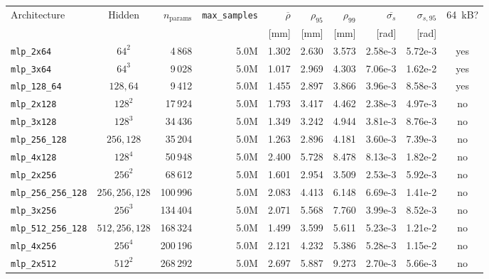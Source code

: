 \documentclass[a4paper,11pt]{article}
\newcommand{\SI}[2]{#1~#2}
\newcommand{\kilo}{k}
\newcommand{\byte}{B}
\begin{document}
\begin{table}[h]
\centering\footnotesize
\setlength{\tabcolsep}{4pt}
\begin{tabular}{lcrrrrrrrc}
\toprule
Architecture & Hidden & $n_{\text{params}}$ & \texttt{max\_samples} &
  $\overline{\rho}$ & $\rho_{95}$ & $\rho_{99}$ & $\overline{\sigma_s}$ &
  $\sigma_{s,95}$ & \SI{64}{\kilo\byte}?\\
             &        &                     &                       &
  [mm]        & [mm]       & [mm]       & [rad]                 &
  [rad]       & \\
\midrule
\texttt{mlp\_2x64}         & $64^2$         &    4\,868 & 5.0M & 1.302 & 2.630 & 3.573 & 2.58e-3 & 5.72e-3 & yes\\
\texttt{mlp\_3x64}         & $64^3$         &    9\,028 & 5.0M & 1.017 & 2.969 & 4.303 & 7.06e-3 & 1.62e-2 & yes\\
\texttt{mlp\_128\_64}      & $128,64$       &    9\,412 & 5.0M & 1.455 & 2.897 & 3.866 & 3.96e-3 & 8.58e-3 & yes\\
\texttt{mlp\_2x128}        & $128^2$        &   17\,924 & 5.0M & 1.793 & 3.417 & 4.462 & 2.38e-3 & 4.97e-3 & no\\
\texttt{mlp\_3x128}        & $128^3$        &   34\,436 & 5.0M & 1.349 & 3.242 & 4.944 & 3.81e-3 & 8.76e-3 & no\\
\texttt{mlp\_256\_128}     & $256,128$      &   35\,204 & 5.0M & 1.263 & 2.896 & 4.181 & 3.60e-3 & 7.39e-3 & no\\
\texttt{mlp\_4x128}        & $128^4$        &   50\,948 & 5.0M & 2.400 & 5.728 & 8.478 & 8.13e-3 & 1.82e-2 & no\\
\texttt{mlp\_2x256}        & $256^2$        &   68\,612 & 5.0M & 1.601 & 2.954 & 3.509 & 2.53e-3 & 5.92e-3 & no\\
\texttt{mlp\_256\_256\_128}& $256,256,128$  &  100\,996 & 5.0M & 2.083 & 4.413 & 6.148 & 6.69e-3 & 1.41e-2 & no\\
\texttt{mlp\_3x256}        & $256^3$        &  134\,404 & 5.0M & 2.071 & 5.568 & 7.760 & 3.99e-3 & 8.52e-3 & no\\
\texttt{mlp\_512\_256\_128}& $512,256,128$  &  168\,324 & 5.0M & 1.499 & 3.599 & 5.611 & 5.23e-3 & 1.21e-2 & no\\
\texttt{mlp\_4x256}        & $256^4$        &  200\,196 & 5.0M & 2.121 & 4.232 & 5.386 & 5.28e-3 & 1.15e-2 & no\\
\texttt{mlp\_2x512}        & $512^2$        &  268\,292 & 5.0M & 2.697 & 5.887 & 9.273 & 2.70e-3 & 5.66e-3 & no\\

\end{tabular}
\end{table}
\end{document}
